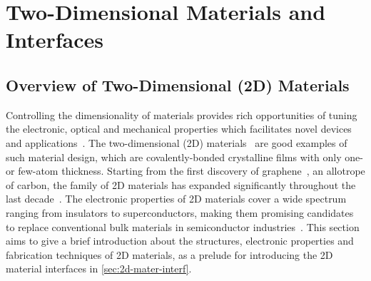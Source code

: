 \chapter{Two-Dimensional Materials and Interfaces}
\label{ch:introduction}
\renewcommand*\imgdir{img/intro/}

%

\vspace{1em}



\section{Overview of Two-Dimensional (2D) Materials}
\label{sec:ch-intro-2D}
Controlling the dimensionality of materials provides rich
opportunities of tuning the electronic, optical and mechanical
properties which facilitates novel devices and applications~\autocite{Davies_1997_book,Ihn_2009_book}.
%
The two-dimensional (2D)
materials~\nocite{Novoselov_2012_roadmap,Mas_Ballest_2011_review,Bhimanapati_2015_2D_rev,Butler_2013_review,Novoselov_2016_vdW,Mannix_2017}
are good examples of such material design, which are
covalently-bonded crystalline films with only one- or few-atom
thickness.
%
Starting from the first discovery of
graphene~\autocite{Novoselov_2004_gr}, an allotrope of carbon, the family
of 2D materials has expanded significantly throughout the last
decade~\autocite{Butler_2013_review,Das_2015_beyond_gr,Novoselov_2016_vdW}.
%
The electronic properties of 2D materials cover a wide spectrum
ranging from insulators to superconductors, making them promising
candidates to replace conventional bulk materials in semiconductor
industries~\autocite{Xia_2014_2D_nanophoto_rev,Bhimanapati_2015_2D_rev}.
%
This section aims to give a brief introduction about the structures,
electronic properties and fabrication techniques of 2D materials, as a
prelude for introducing the 2D material interfaces in
\autoref{sec:2d-mater-interf}.

